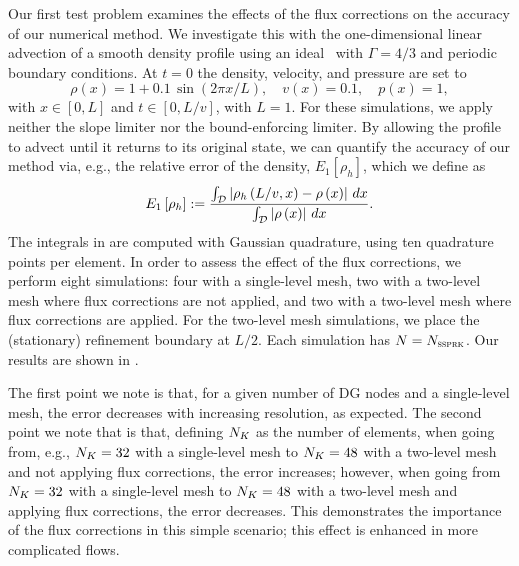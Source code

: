 Our first test problem examines the effects of the flux corrections on the
accuracy of our numerical method.
We investigate this with the one-dimensional linear advection of a
smooth density profile using an ideal \eos\ with $\Gamma=4/3$
and periodic boundary conditions.
At $t=0$ the density, velocity, and pressure are set to
\begin{equation}
  \rho\left(x\right)=1+0.1\,\sin\left(2\pi x/L\right),
  \hspace{1em}v\left(x\right)=0.1,\hspace{1em}p\left(x\right)=1,
\end{equation}
with $x\in\left[0,L\right]$ and $t\in\left[0,L/v\right]$, with $L=1$.
For these simulations, we apply neither the slope limiter nor the
bound-enforcing limiter.
By allowing the profile to advect until it returns to its original state,
we can quantify the accuracy of our method via, e.g., the relative error of
the density, $E_{1}\left[\rho_{h}\right]$, which we define as
\begin{equation}
  E_{1}\left[\rho_{h}\right]
  :=\frac{\int_{\mathcal{D}}\left|\rho_{h}\left(L/v,x\right)
          -\rho\left(x\right)\right|\,dx}
         {\int_{\mathcal{D}}\left|\rho\left(x\right)\right|\,dx}.
  \label{eq.Error}
\end{equation}
The integrals in  are computed with Gaussian quadrature,
using ten quadrature points per element.
In order to assess the effect of the flux corrections, we perform eight
simulations: four with a single-level mesh, two with a two-level mesh
where flux corrections are not applied,
and two with a two-level mesh where flux corrections are applied.
For the two-level mesh simulations, we place the (stationary)
refinement boundary at $L/2$.
Each simulation has $N=N_{\textsc{ssprk}}$.
Our results are shown in .


The first point we note is that, for a given number of DG nodes and
a single-level mesh, the error decreases with increasing
resolution, as expected.
The second point we note that is that, defining $N_{K}$ as the number of
elements, when going from, e.g., $N_{K}=32$ with a single-level mesh
to $N_{K}=48$ with a two-level mesh and not applying flux corrections,
the error increases;
however, when going from $N_{K}=32$ with a single-level mesh
to $N_{K}=48$ with a two-level mesh and applying flux corrections,
the error decreases.
This demonstrates the importance of the flux corrections in this simple
scenario;
this effect is enhanced in more complicated flows.

